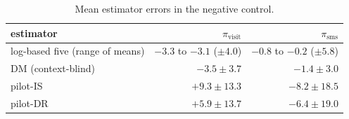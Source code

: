 \begin{table}[!htbp]
\centering
\caption{Mean estimator errors in the negative control.}
\label{tab:control}
\footnotesize
\begin{tabular}{lrr}
\toprule
estimator & $\pi_{\mathrm{visit}}$ & $\pi_{\mathrm{sms}}$ \\
\midrule
log-based five (range of means) & $-3.3$ to $-3.1$ ($\pm 4.0$) & $-0.8$ to $-0.2$ ($\pm 5.8$) \\
DM (context-blind) & $-3.5 \pm 3.7$ & $-1.4 \pm 3.0$ \\
pilot-IS & $+9.3 \pm 13.3$ & $-8.2 \pm 18.5$ \\
pilot-DR & $+5.9 \pm 13.7$ & $-6.4 \pm 19.0$ \\
\bottomrule
\end{tabular}
\end{table}
